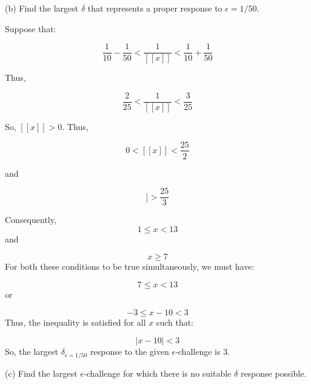 \documentclass[10pt]{article}
\begin{document}
(b) Find the largest $\displaystyle \delta $ that represents a proper response to $\displaystyle \epsilon =1/50$.



Suppose that:




\begin{equation*}
\frac{1}{10} -\frac{1}{50} < \frac{1}{[[ x]]} < \frac{1}{10} +\frac{1}{50}
\end{equation*}


Thus,


\begin{equation*}
\frac{2}{25} < \frac{1}{[[ x]]} < \frac{3}{25}
\end{equation*}


So, $\displaystyle [[ x]]  >0$. Thus, 


\begin{equation*}
0< [[ x]] < \frac{25}{2}
\end{equation*}


and


\begin{equation*}
[[ x]]  >\frac{25}{3}
\end{equation*}


Consequently,
\begin{equation*}
1\leq x< 13
\end{equation*}
and


\begin{equation*}
x\geq 7
\end{equation*}
For both these conditions to be true simultaneously, we must have:


\begin{equation*}
7\leq x< 13
\end{equation*}
or


\begin{equation*}
-3\leq x-10< 3
\end{equation*}
Thus, the inequality is satisfied for all $\displaystyle x$ such that:


\begin{equation*}
|x-10|< 3
\end{equation*}
So, the largest $\displaystyle \delta _{\epsilon =1/50}$ response to the given $\displaystyle \epsilon $-challenge is $\displaystyle 3$.



(c) Find the largest $\displaystyle \epsilon $-challenge for which there is no suitable $\displaystyle \delta $ response possible.
\end{document}
